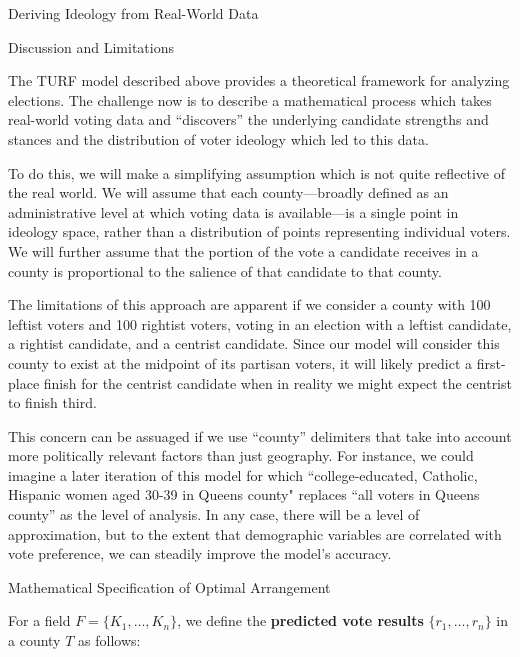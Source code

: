 \documentclass{article}
\begin{document}
\begin{section}{Deriving Ideology from Real-World Data}

\begin{subsection}{Discussion and Limitations}

The TURF model described above provides a theoretical framework for analyzing elections. The challenge now is to describe a mathematical process which takes real-world voting data and ``discovers'' the underlying candidate strengths and stances and the distribution of voter ideology which led to this data.

To do this, we will make a simplifying assumption which is not quite reflective of the real world. We will assume that each county---broadly defined as an administrative level at which voting data is available---is a single point in ideology space, rather than a distribution of points representing individual voters. We will further assume that the portion of the vote a candidate receives in a county is proportional to the salience of that candidate to that county.

The limitations of this approach are apparent if we consider a county with 100 leftist voters and 100 rightist voters, voting in an election with a leftist candidate, a rightist candidate, and a centrist candidate. Since our model will consider this county to exist at the midpoint of its partisan voters, it will likely predict a first-place finish for the centrist candidate when in reality we might expect the centrist to finish third.

This concern can be assuaged if we use ``county'' delimiters that take into account more politically relevant factors than just geography. For instance, we could imagine a later iteration of this model for which ``college-educated, Catholic, Hispanic women aged 30-39 in Queens county" replaces ``all voters in Queens county'' as the level of analysis. In any case, there will be a level of approximation, but to the extent that demographic variables are correlated with vote preference, we can steadily improve the model's accuracy.

\end{subsection}

\begin{subsection}{Mathematical Specification of Optimal Arrangement}

For a field $F = \{K_1, \ldots, K_n\}$, we define the \textbf{predicted vote results} $\{r_1, \ldots, r_n\}$ in a county $T$ as follows:


\end{subsection}
\end{section}
\end{document}
